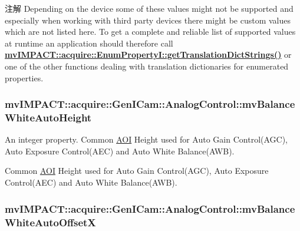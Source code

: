 \begin{DoxyNote}{注解}
Depending on the device some of these values might not be supported and especially when working with third party devices there might be custom values which are not listed here. To get a complete and reliable list of supported values at runtime an application should therefore call {\bfseries \hyperlink{classmv_i_m_p_a_c_t_1_1acquire_1_1_enum_property_i_a0ba6ccbf5ee69784d5d0b537924d26b6}{mv\+I\+M\+P\+A\+C\+T\+::acquire\+::\+Enum\+Property\+I\+::get\+Translation\+Dict\+Strings()}} or one of the other functions dealing with translation dictionaries for enumerated properties. 
\end{DoxyNote}
\hypertarget{classmv_i_m_p_a_c_t_1_1acquire_1_1_gen_i_cam_1_1_analog_control_a478acf3594e6d2f6de955d4397687454}{
\subsubsection[{mv\+Balance\+White\+Auto\+Height}]{ mv\+I\+M\+P\+A\+C\+T\+::acquire\+::\+Gen\+I\+Cam\+::\+Analog\+Control\+::mv\+Balance\+White\+Auto\+Height}}\label{classmv_i_m_p_a_c_t_1_1acquire_1_1_gen_i_cam_1_1_analog_control_a478acf3594e6d2f6de955d4397687454}


An integer property. Common \hyperlink{struct_a_o_i}{A\+O\+I} Height used for Auto Gain Control(\+A\+G\+C), Auto Exposure Control(\+A\+E\+C) and Auto White Balance(\+A\+W\+B). 

Common \hyperlink{struct_a_o_i}{A\+O\+I} Height used for Auto Gain Control(\+A\+G\+C), Auto Exposure Control(\+A\+E\+C) and Auto White Balance(\+A\+W\+B). \hypertarget{classmv_i_m_p_a_c_t_1_1acquire_1_1_gen_i_cam_1_1_analog_control_a86d9c22a6cb1eb1d62374191e808b4e3}{
\subsubsection[{mv\+Balance\+White\+Auto\+Offset\+X}]{ mv\+I\+M\+P\+A\+C\+T\+::acquire\+::\+Gen\+I\+Cam\+::\+Analog\+Control\+::mv\+Balance\+White\+Auto\+Offset\+X}}\label{classmv_i_m_p_a_c_t_1_1acquire_1_1_gen_i_cam_1_1_analog_control_a86d9c22a6cb1eb1d62374191e808b4e3}


